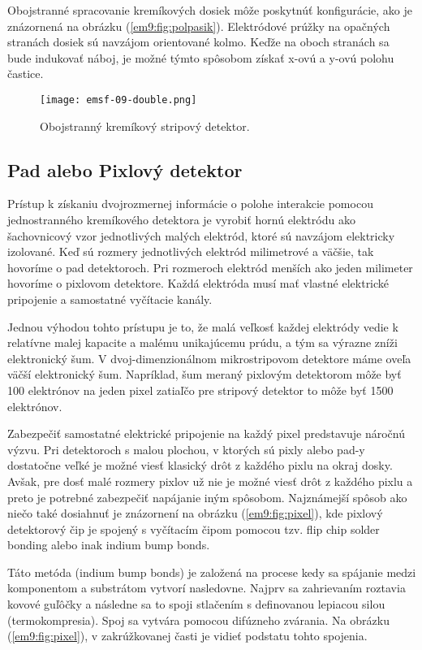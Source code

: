 \documentclass[../../main.tex]{subfiles}
\begin{document}
Obojstranné spracovanie kremíkových dosiek môže poskytnúť konfigurácie, ako je znázornená na obrázku (\ref{em9:fig:polpasik}). Elektródové prúžky na opačných stranách dosiek sú navzájom orientované kolmo. Keďže na oboch stranách sa bude indukovať náboj, je možné týmto spôsobom získať x-ovú a y-ovú polohu častice.

\begin{figure}[!h]
\texttt{[image: emsf-09-double.png]}
\centering
\caption{Obojstranný kremíkový stripový detektor.}
\label{em9:fig:double}
\end{figure}

\subsection{Pad alebo Pixlový detektor}
Prístup k získaniu dvojrozmernej informácie o polohe interakcie pomocou jednostranného kremíkového detektora je vyrobiť hornú elektródu ako šachovnicový vzor jednotlivých malých elektród, ktoré sú navzájom elektricky izolované. Keď sú rozmery jednotlivých elektród milimetrové a väčšie, tak hovoríme o pad detektoroch. Pri rozmeroch elektród menších ako jeden milimeter hovoríme o pixlovom detektore. Každá elektróda musí mať vlastné elektrické pripojenie a samostatné vyčítacie kanály.

Jednou výhodou tohto prístupu je to, že malá veľkosť každej elektródy vedie k relatívne malej kapacite a malému unikajúcemu prúdu, a tým sa výrazne zníži elektronický šum. V dvoj-dimenzionálnom mikrostripovom detektore máme oveľa väčší elektronický šum. Napríklad, šum meraný pixlovým detektorom môže byť 100 elektrónov na jeden pixel zatiaľčo pre stripový detektor to môže byť 1500 elektrónov.

Zabezpečiť samostatné elektrické pripojenie na každý pixel predstavuje náročnú výzvu. Pri detektoroch s malou plochou, v ktorých sú pixly alebo pad-y dostatočne veľké je možné viesť klasický drôt z každého pixlu na okraj dosky. Avšak, pre dosť malé rozmery pixlov už nie je možné viesť drôt z každého pixlu a preto je potrebné zabezpečiť napájanie iným spôsobom. Najznámejší spôsob ako niečo také dosiahnuť je znázornení na obrázku (\ref{em9:fig:pixel}), kde pixlový detektorový čip je spojený s vyčítacím čipom pomocou tzv. flip chip solder bonding alebo inak indium bump bonds. 

Táto metóda (indium bump bonds) je založená na procese kedy sa spájanie medzi komponentom a substrátom vytvorí nasledovne. Najprv sa zahrievaním roztavia kovové guľôčky a následne sa to spoji stlačením s definovanou lepiacou silou (termokompresia). Spoj sa vytvára pomocou difúzneho zvárania. Na obrázku (\ref{em9:fig:pixel}), v zakrúžkovanej časti je vidieť podstatu tohto spojenia.
\end{document}
